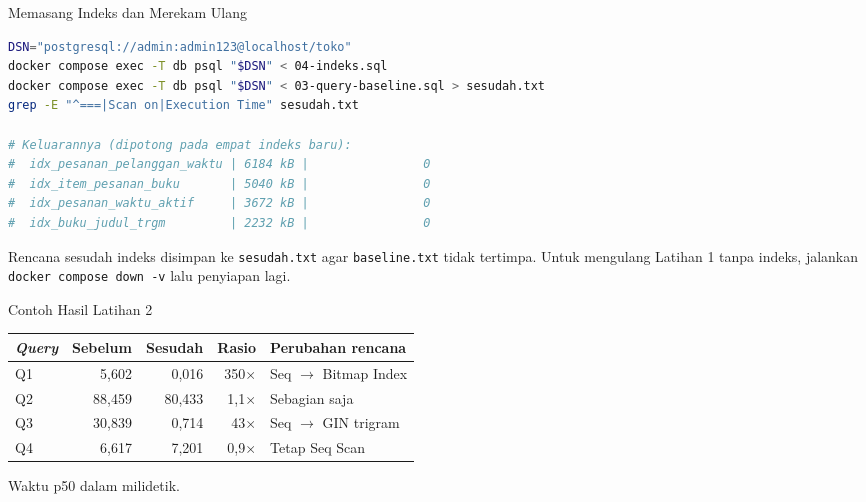 \documentclass[aspectratio=169, table, 12pt]{beamer}
\begin{document}
\begin{frame}[fragile]{{\Large Memasang Indeks dan Merekam Ulang}}
  \vspace{2pt}
\begin{lstlisting}[language=bash]
DSN="postgresql://admin:admin123@localhost/toko"
docker compose exec -T db psql "$DSN" < 04-indeks.sql
docker compose exec -T db psql "$DSN" < 03-query-baseline.sql > sesudah.txt
grep -E "^===|Scan on|Execution Time" sesudah.txt

# Keluarannya (dipotong pada empat indeks baru):
#  idx_pesanan_pelanggan_waktu | 6184 kB |                0
#  idx_item_pesanan_buku       | 5040 kB |                0
#  idx_pesanan_waktu_aktif     | 3672 kB |                0
#  idx_buku_judul_trgm         | 2232 kB |                0
\end{lstlisting}

  \vspace{2pt}
  {\footnotesize Rencana sesudah indeks disimpan ke \texttt{sesudah.txt} agar
  \texttt{baseline.txt} tidak tertimpa. Untuk mengulang Latihan 1 tanpa indeks,
  jalankan \texttt{docker compose down -v} lalu penyiapan lagi.}
\end{frame}

\begin{frame}{{\Large Contoh Hasil Latihan 2}}
  \vspace{5pt}
  {\centering
  {\small
  \begin{tabularx}{\textwidth}{lrrrX}
    \hline
    \textbf{\textit{Query}} & \textbf{Sebelum} & \textbf{Sesudah} & \textbf{Rasio} & \textbf{Perubahan rencana} \\
    \hline
    Q1 & 5,602 & 0,016 & 350$\times$ & Seq $\rightarrow$ Bitmap Index \\
    \hline
    Q2 & 88,459 & 80,433 & 1,1$\times$ & Sebagian saja \\
    \hline
    Q3 & 30,839 & 0,714 & 43$\times$ & Seq $\rightarrow$ GIN trigram \\
    \hline
    Q4 & 6,617 & 7,201 & 0,9$\times$ & Tetap Seq Scan \\
    \hline
  \end{tabularx}}\par}

  \vspace{8pt}
  {\footnotesize Waktu p50 dalam milidetik.}
\end{frame}
\end{document}
